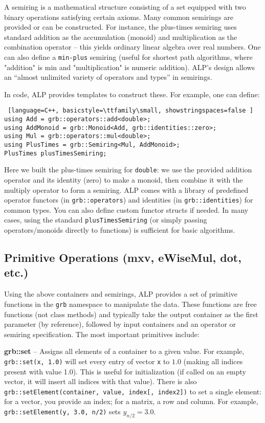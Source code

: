 A semiring is a mathematical structure consisting of a set equipped with two binary operations satisfying certain axioms. 
Many common semirings are provided or can be constructed. 
For instance, the plus-times semiring uses standard addition as the accumulation (monoid) 
and multiplication as the combination operator – this yields ordinary linear algebra over real numbers. 
One can also define a \texttt{min-plus} semiring (useful for shortest path algorithms, where "addition" 
is min and "multiplication" is numeric addition). ALP’s design allows an “almost unlimited variety of operators 
and types” in semirings.

In code, ALP provides templates to construct these. For example, one can define:
\begin{lstlisting} [language=C++, basicstyle=\ttfamily\small, showstringspaces=false ]
using Add = grb::operators::add<double>;
using AddMonoid = grb::Monoid<Add, grb::identities::zero>;
using Mul = grb::operators::mul<double>;
using PlusTimes = grb::Semiring<Mul, AddMonoid>;
PlusTimes plusTimesSemiring;
\end{lstlisting}
Here we built the plus-times semiring for \texttt{double}: we use the provided addition operator and its identity (zero) to make a monoid, then combine it with the multiply operator to form a semiring. ALP comes with a library of predefined operator functors (in \texttt{grb::operators}) and identities (in \texttt{grb::identities}) for common types. You can also define custom functor structs if needed. In many cases, using the standard \texttt{plusTimesSemiring} (or simply passing operators/monoids directly to functions) is sufficient for basic algorithms.

\subsection{Primitive Operations (mxv, eWiseMul, dot, etc.)}

Using the above containers and semirings, ALP provides a set of primitive functions in the \texttt{grb} namespace to manipulate the data. These functions are free functions (not class methods) and typically take the output container as the first parameter (by reference), followed by input containers and an operator or semiring specification. The most important primitives include:

    \textbf{grb::set} – Assigns all elements of a container to a given value. For example, \texttt{grb::set(x, 1.0)} will set every entry of vector \texttt{x} to $1.0$ (making all indices present with value 1.0). This is useful for initialization (if called on an empty vector, it will insert all indices with that value). There is also \texttt{grb::setElement(container, value, index[, index2])} to set a single element: for a vector, you provide an index; for a matrix, a row and column. For example, \texttt{grb::setElement(y, 3.0, n/2)} sets $y_{n/2} = 3.0$.
\newline

